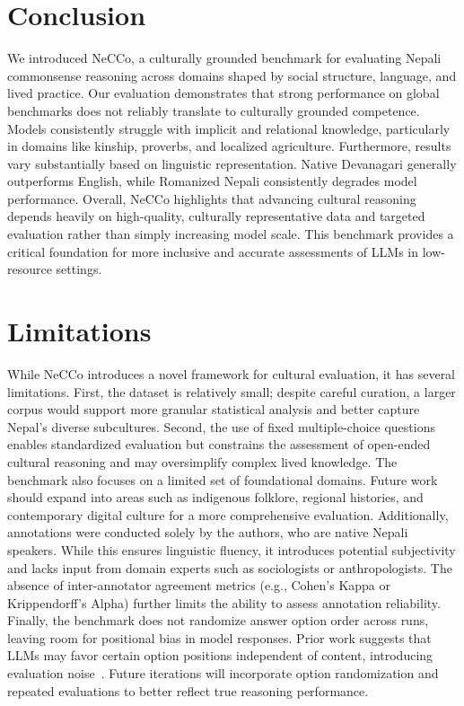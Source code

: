 \documentclass[10pt, a4paper]{article}
\begin{document}
\section{Conclusion}
We introduced NeCCo, a culturally grounded benchmark for evaluating Nepali commonsense reasoning across domains shaped by social structure, language, and lived practice. Our evaluation demonstrates that strong performance on global benchmarks does not reliably translate to culturally grounded competence. Models consistently struggle with implicit and relational knowledge, particularly in domains like kinship, proverbs, and localized agriculture. Furthermore, results vary substantially based on linguistic representation. Native Devanagari generally outperforms English, while Romanized Nepali consistently degrades model performance. Overall, NeCCo highlights that advancing cultural reasoning depends heavily on high-quality, culturally representative data and targeted evaluation rather than simply increasing model scale. This benchmark provides a critical foundation for more inclusive and accurate assessments of LLMs in low-resource settings.

\section{Limitations}
While NeCCo introduces a novel framework for cultural evaluation, it has several limitations. First, the dataset is relatively small; despite careful curation, a larger corpus would support more granular statistical analysis and better capture Nepal’s diverse subcultures. Second, the use of fixed multiple-choice questions enables standardized evaluation but constrains the assessment of open-ended cultural reasoning and may oversimplify complex lived knowledge. The benchmark also focuses on a limited set of foundational domains. Future work should expand into areas such as indigenous folklore, regional histories, and contemporary digital culture for a more comprehensive evaluation. Additionally, annotations were conducted solely by the authors, who are native Nepali speakers. While this ensures linguistic fluency, it introduces potential subjectivity and lacks input from domain experts such as sociologists or anthropologists. The absence of inter-annotator agreement metrics (e.g., Cohen’s Kappa or Krippendorff’s Alpha) further limits the ability to assess annotation reliability. Finally, the benchmark does not randomize answer option order across runs, leaving room for positional bias in model responses. Prior work suggests that LLMs may favor certain option positions independent of content, introducing evaluation noise~\cite{pezeshkpour2024large}. Future iterations will incorporate option randomization and repeated evaluations to better reflect true reasoning performance.
\end{document}
